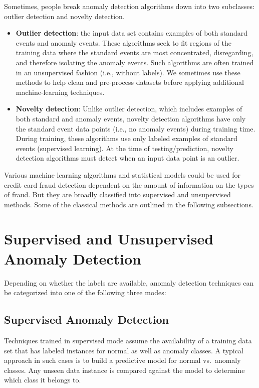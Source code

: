 \documentclass[
]{book}
\begin{document}
Sometimes, people break anomaly detection algorithms down into two subclasses: outlier detection and novelty detection.

\begin{itemize}
\item
  \textbf{Outlier detection}: the input data set contains examples of both standard events and anomaly events. These algorithms seek to fit regions of the training data where the standard events are most concentrated, disregarding, and therefore isolating the anomaly events. Such algorithms are often trained in an unsupervised fashion (i.e., without labels). We sometimes use these methods to help clean and pre-process datasets before applying additional machine-learning techniques.
\item
  \textbf{Novelty detection}: Unlike outlier detection, which includes examples of both standard and anomaly events, novelty detection algorithms have only the standard event data points (i.e., no anomaly events) during training time. During training, these algorithms use only labeled examples of standard events (supervised learning). At the time of testing/prediction, novelty detection algorithms must detect when an input data point is an outlier.
\end{itemize}

Various machine learning algorithms and statistical models could be used for credit card fraud detection dependent on the amount of information on the types of fraud. But they are broadly classified into supervised and unsupervised methods. Some of the classical methods are outlined in the following subsections.

\hypertarget{supervised-and-unsupervised-anomaly-detection}{%
\section{Supervised and Unsupervised Anomaly Detection}\label{supervised-and-unsupervised-anomaly-detection}}

Depending on whether the labels are available, anomaly detection techniques can be categorized into one of the following three modes:

\hypertarget{supervised-anomaly-detection}{%
\subsection{Supervised Anomaly Detection}\label{supervised-anomaly-detection}}

Techniques trained in supervised mode assume the availability of a training data set that has labeled instances for normal as well as anomaly classes. A typical approach in such cases is to build a predictive model for normal vs.~anomaly classes. Any unseen data instance is compared against the model to determine which class it belongs to.
\end{document}
